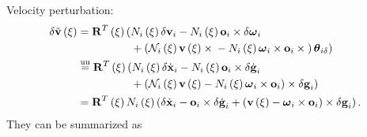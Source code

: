 Velocity perturbation:
\begin{align}
	\delta\tilde{\T{v}}\plbr{\xi}
	&=
	\TT{R}^T\plbr{\xi} \lplbr{
		N_i\plbr{\xi} \delta\T{v}_i
		- N_i\plbr{\xi} \T{o}_i \times \delta\T{\omega}_i
	}
	\nonumber \\
	& \hphantom{= \TT{R}^T\plbr{\xi}(}
	\rplbr{
		\mbox{} + \plbr{
			\mathcal{N}_i\plbr{\xi} \T{v}\plbr{\xi} \times{}
			- N_i\plbr{\xi} \T{\omega}_i \times \T{o}_i \times{}
		} \T{\theta}_{i\delta}
	}
	\nonumber \\
	&\equu
	\TT{R}^T\plbr{\xi} \lplbr{
		N_i\plbr{\xi} \delta\dot{\T{x}}_i
		- N_i\plbr{\xi} \T{o}_i \times \delta\dot{\T{g}}_i
	}
	\nonumber \\
	& \hphantom{= \TT{R}^T\plbr{\xi}(}
	\rplbr{
		\mbox{} + \plbr{
			\mathcal{N}_i\plbr{\xi} \T{v}\plbr{\xi}
			- N_i\plbr{\xi} \T{\omega}_i \times \T{o}_i
		} \times \delta\T{g}_i
	}
	\nonumber \\
	&=
	\TT{R}^T\plbr{\xi} N_i\plbr{\xi} \plbr{
		\delta\dot{\T{x}}_i
		- \T{o}_i \times \delta\dot{\T{g}}_i
		+ \plbr{
			\T{v}\plbr{\xi}
			- \T{\omega}_i \times \T{o}_i
		} \times \delta\T{g}_i
	}
	.
\end{align}
They can be summarized as
